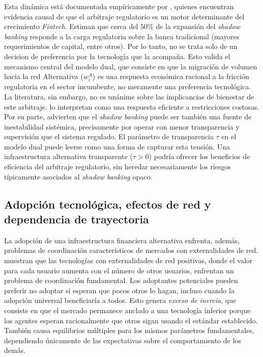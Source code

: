 Esta dinámica está documentada empíricamente por , quienes encuentran evidencia causal de que el arbitraje regulatorio es un motor determinante del crecimiento \textit{Fintech}. 
Estiman que cerca del $50\%$ de la expansión del \textit{shadow banking} responde a la carga regulatoria sobre la banca tradicional (mayores requerimientos de capital, entre otros).
Por lo tanto, no se trata solo de un decision de preferencia por la tecnología que la acompaña.
Esto valida el mecanismo central del modelo dual, que consiste en que la migración de volumen hacia la red Alternativa ($w_i^A$) es una respuesta económica racional a la fricción regulatoria en el sector incumbente, no meramente una preferencia tecnológica.
La literatura, sin embargo, no es unánime sobre las implicancias de bienestar de
este arbitraje.  lo interpretan como una
respuesta eficiente a restricciones costosas. Por su parte, 
advierten que el \textit{shadow banking} puede ser también una fuente de
inestabilidad sistémica, precisamente por operar con menor transparencia y
supervisión que el sistema regulado. El parámetro de transparencia $\tau$ en el
modelo dual puede leerse como una forma de capturar esta tensión. Una infraestructura alternativa transparente ($\tau > 0$) podría ofrecer los beneficios de eficiencia del arbitraje regulatorio, sin heredar necesariamente
los riesgos típicamente asociados al \textit{shadow banking} opaco.

\subsection{Adopción tecnológica, efectos de red y dependencia de trayectoria}

La adopción de una infraestructura financiera alternativa enfrenta, además,
problemas de coordinación característicos de mercados con externalidades de
red.  muestran que las tecnologías con externalidades
de red positivas, donde el valor para cada usuario aumenta con el número de
otros usuarios, enfrentan un problema de coordinación fundamental. Los adoptantes potenciales pueden preferir no adoptar si esperan que pocos otros lo hagan, incluso cuando la adopción universal beneficiaría a todos. 
Esto genera \textit{exceso de inercia}, que consiste en que el mercado permanece anclado a una tecnología
inferior porque los agentes esperan racionalmente que otros sigan usando el
estándar establecido. También causa equilibrios múltiples para los mismos parámetros
fundamentales, dependiendo únicamente de las expectativas sobre el
comportamiento de los demás.

